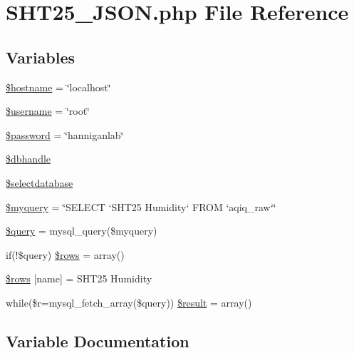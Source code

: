 \hypertarget{_s_h_t25___j_s_o_n_8php}{}\section{S\+H\+T25\+\_\+\+J\+S\+O\+N.\+php File Reference}
\label{_s_h_t25___j_s_o_n_8php}
\subsection*{Variables}
\begin{DoxyCompactItemize}
\item 
\hyperlink{_s_h_t25___j_s_o_n_8php_a8bf9ffb42ed554b203b55377d1fc9aa4}{\$hostname} = \char`\"{}localhost\char`\"{}
\item 
\hyperlink{_s_h_t25___j_s_o_n_8php_a0eb82aa5f81cf845de4b36cd653c42cf}{\$username} = \char`\"{}root\char`\"{}
\item 
\hyperlink{_s_h_t25___j_s_o_n_8php_a607686ef9f99ea7c42f4f3dd3dbb2b0d}{\$password} = \char`\"{}hanniganlab\char`\"{}
\item 
\hyperlink{_s_h_t25___j_s_o_n_8php_a013f690a9cf598d1498e72aa8aa8a8d2}{\$dbhandle}
\item 
\hyperlink{_s_h_t25___j_s_o_n_8php_a3a00cb9dd022e8ab0cdfe17aad984a14}{\$selectdatabase}
\item 
\hyperlink{_s_h_t25___j_s_o_n_8php_a8ff37acfddb2efb7962bb94d1c6d0d1c}{\$myquery} = \char`\"{}S\+E\+L\+E\+CT `S\+H\+T25 Humidity` F\+R\+OM `aqiq\+\_\+raw`\char`\"{}
\item 
\hyperlink{_s_h_t25___j_s_o_n_8php_af59a5f7cd609e592c41dc3643efd3c98}{\$query} = mysql\+\_\+query(\$myquery)
\item 
if(!\$query) \hyperlink{_s_h_t25___j_s_o_n_8php_a9d560e904e6665a6ee21f86a65c1ef8e}{\$rows} = array()
\item 
\hyperlink{_s_h_t25___j_s_o_n_8php_a6384d385f2f9c3f6bcad27ed87e67106}{\$rows} \mbox{[}\textquotesingle{}name\textquotesingle{}\mbox{]} = \textquotesingle{}S\+H\+T25 Humidity\textquotesingle{}
\item 
while(\$r=mysql\+\_\+fetch\+\_\+array(\$query)) \hyperlink{_s_h_t25___j_s_o_n_8php_a9148136d1e11f768be4f805d7e567da2}{\$result} = array()
\end{DoxyCompactItemize}


\subsection{Variable Documentation}
